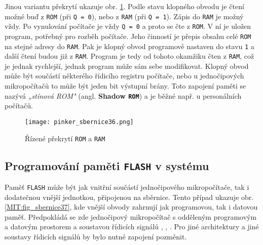       Jinou variantu překrytí ukazuje obr. \ref{MIT:fig_sbernice36}. Podle stavu klopného obvodu je 
      čtení možné buď z \texttt{ROM} (při \texttt{Q = 0}), nebo z \texttt{RAM} (při \texttt{Q = 
      1}). Zápis do \texttt{RAM}  je možný vždy. Po vynulování počítače je vždy \texttt{Q = 0} a 
      proto se čte z \texttt{ROM}. V ní je uložen program, potřebný pro rozběh počítače. Jeho 
      činností je přepis obsahu celé \texttt{ROM} na stejné adresy do \texttt{RAM}. Pak je klopný 
      obvod programově nastaven do stavu \texttt{1} a další čtení budou již z \texttt{RAM}. Program 
      je tedy od tohoto okamžiku čten z \texttt{RAM}, což je jednak rychlejší, jednak program může 
      sám sebe modifikovat. Klopný obvod může být součástí některého řídicího registru počítače, 
      nebo u jednočipových mikropočítačů to může být jeden bit výstupní brány. Toto zapojení paměti 
      se nazývá \emph{„stínová ROM"} (angl. \textbf{Shadow \texttt{ROM}}) a je běžné např. u 
      personálních počítačů.
      
      \begin{figure}[ht!] %
        \centering
        \texttt{[image: pinker\_sbernice36.png]}
        \caption{Řízené překrytí \texttt{ROM} a \texttt{RAM}}
        \label{MIT:fig_sbernice36}
      \end{figure}
    
    \subsection{Programování paměti \texttt{FLASH} v systému}
      Paměť \texttt{FLASH} může být jak vnitřní součástí jednočipového mikropočítače, tak i 
      dodatečnou vnější jednotkou, připojenou na sběrnice. Tento případ ukazuje obr. 
      \ref{MIT:fig_sbernice37}, kde vnější obvody zahrnují jak programovou, tak i datovou paměť. 
      Předpokládá se zde jednočipový mikropočítač s odděleným programovým a datovým prostorem a 
      soustavou řídicích signálů , , 
      . Pro jiné architektury a jiné soustavy řídicích signálů by bylo 
      nutné zapojení pozměnit.
      
